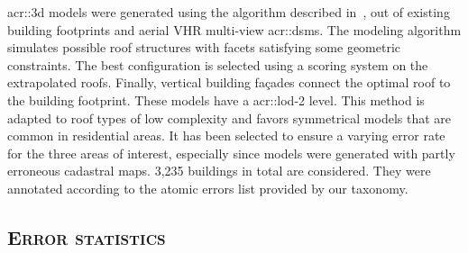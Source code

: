         \gls{acr::3d} models were generated using the algorithm described in~\parencite{durupt2006automatic}, out of existing building footprints and aerial VHR multi-view \glspl{acr::dsm}.
        The modeling algorithm simulates possible roof structures with facets satisfying some geometric constraints.
        The best configuration is selected using a scoring system on the extrapolated roofs.
        Finally, vertical building fa\c{c}ades connect the optimal roof to the building footprint.
        These models have a \gls{acr::lod}-2 level.
        This method is adapted to roof types of low complexity and favors symmetrical models that are common in residential areas.
        It has been selected to ensure a varying error rate for the three areas of interest, especially since models were generated with partly erroneous cadastral maps.
        3,235 buildings in total are considered.
        They were annotated according to the atomic errors list provided by our taxonomy.

    \subsection{\textsc{Error statistics}}
        \label{subsec::experiments::datasets::stats}
        \begin{figure}[htpb]
            \centering
        \end{figure}
        \begin{figure}[htpb]
            \centering
        \end{figure}
        \begin{figure}[htpb]
            \centering
        \end{figure}

